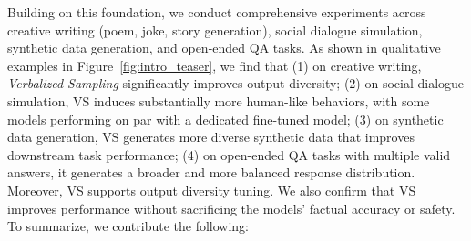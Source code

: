 Building on this foundation, we conduct comprehensive experiments across creative writing (poem, joke, story generation), social dialogue simulation, synthetic data generation, and open-ended QA tasks. As shown in qualitative examples in Figure~\ref{fig:intro_teaser}, 
we find that (1) on creative writing, \emph{Verbalized Sampling} significantly improves output diversity; (2) on social dialogue simulation, VS induces substantially more human-like behaviors, with some models performing on par with a dedicated fine-tuned model; (3) on synthetic data generation, VS generates more diverse synthetic data that improves downstream task performance;
(4) on open-ended QA tasks with multiple valid answers, it generates a broader and more balanced response distribution. Moreover, VS supports output diversity tuning. We also confirm that VS improves performance without sacrificing the models' factual accuracy or safety. To summarize, we contribute the following: %
